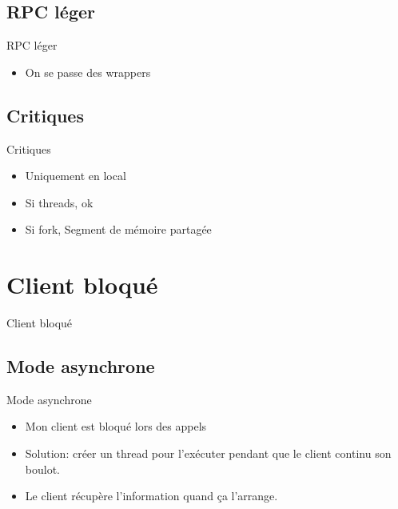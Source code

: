 \begin{frame}{\sectitle}
    \def\subsectitle{RPC léger}
    \subsection{\subsectitle}
    \begin{block}{\subsectitle}
        \begin{itemize}
            \item On se passe des wrappers
        \end{itemize}
    \end{block}
    \def\subsectitle{Critiques}
    \subsection{\subsectitle}
    \begin{block}{\subsectitle}
        \begin{itemize}
            \item Uniquement en local
            \item Si threads, ok 
            \item Si fork, Segment de mémoire partagée
        \end{itemize}
    \end{block}
\end{frame}


\def\sectitle{Client bloqué}
\section{\sectitle}
\begin{frame}{\sectitle}
    \def\subsectitle{Mode asynchrone}
    \subsection{\subsectitle}
    \begin{block}{\subsectitle}
        \begin{itemize}
            \item Mon client est bloqué lors des appels
            \item Solution: créer un thread pour l'exécuter pendant que le
                client continu son boulot.
            \item Le client récupère l'information quand ça l'arrange.
        \end{itemize}
    \end{block}
\end{frame}

